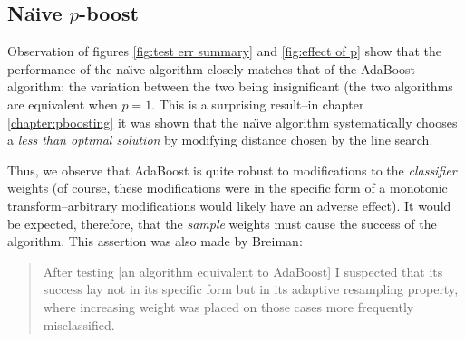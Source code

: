 \subsection{Na\"{\i}ve $p$-boost}

Observation of figures \ref{fig:test err summary} and \ref{fig:effect
of p} show that the performance of the na\"{\i}ve algorithm closely
matches that of the AdaBoost algorithm; the variation between the two
being insignificant (the two algorithms are equivalent when $p = 1$.
This is a surprising result--in chapter \ref{chapter:pboosting} it was
shown that the na\"{\i}ve algorithm systematically chooses a
\emph{less than optimal solution} by modifying distance chosen by the
line search.

Thus, we observe that AdaBoost is quite robust to modifications to the
\emph{classifier} weights (of course, these modifications were in the
specific form of a monotonic transform--arbitrary modifications would
likely have an adverse effect).  It would be expected, therefore, that
the \emph{sample} weights must cause the success of the algorithm.
This assertion was also made by Breiman:

\begin{quotation}
After testing [an algorithm equivalent to AdaBoost] I suspected that
its success lay not in its specific form but in its adaptive
resampling property, where increasing weight was placed on those cases
more frequently misclassified.  \cite{Breiman96}
\end{quotation}


